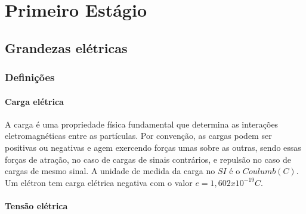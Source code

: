 \documentclass[12pt,fleqn]{book} %
\begin{document}
\cleardoublepage %

\pagestyle{fancy} %



\part{Primeiro Estágio}



\chapter{Grandezas elétricas}
	
	    \section{Definições}
	        
	        \subsection{Carga elétrica}
	           
	           \begin{definition}     
	        
	        A carga é uma propriedade física fundamental que determina as interações eletromagnéticas entre as partículas. Por convenção, as cargas podem ser positivas ou negativas e agem exercendo forças umas sobre as outras, sendo essas forças de atração, no caso de cargas de sinais contrários, e repulsão no caso de cargas de mesmo sinal. A unidade de medida da carga no $SI$ é o $Coulumb ( C )$. Um elétron tem carga elétrica negativa com o valor $e = 1,602x10^{-19} C$.
	        \end{definition}
	        
	        \subsection{Tensão elétrica}
	            
\end{document}
